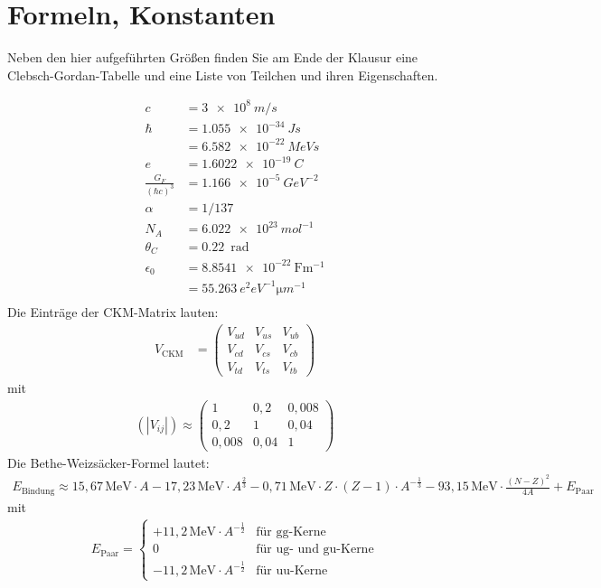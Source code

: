 \thispagestyle{empty}
\section*{Formeln, Konstanten}
Neben den hier aufgef\"uhrten Gr\"o{\ss}en finden Sie am Ende der Klausur eine Clebsch-Gordan-Tabelle und eine Liste von Teilchen und ihren Eigenschaften.

\begin{align*}
 c &= \SI{3e8}{m/s} \\
 \hbar &= \SI{1.055e-34}{Js} \\ &= \SI{6.582e-22}{MeV s}\\
 e &= \SI{1.6022e-19}{C} \\ 
 \frac{G_F}{(\hbar c)^3} &= \SI{1.166e-5}{GeV^{-2}} \\
 \alpha &= 1/137 \\
 N_A &= \SI{6.022e23}{mol^{-1}} \\
 \theta_C &= 0.22 \, {\text{ rad}} \\
 \epsilon_0 &= \SI{8.8541e-22}{\farad \metre^{-1}} \\ &= \SI{55.263}{e^2 eV^{-1} \micro m^{-1}} \\
\end{align*}
Die Einträge der CKM-Matrix lauten:
\begin{align*}
    V_\text{CKM} &= 
      \begin{pmatrix}
      V_{ud} & V_{us} & V_{ub} \\
      V_{cd} & V_{cs} & V_{cb} \\
      V_{td} & V_{ts} & V_{tb}
  \end{pmatrix}
\end{align*}
mit
\begin{align*}
 (|V_{ij}|) \approx
  \begin{pmatrix}
      1         & 0,2   & 0,008 \\
      0,2     & 1       & 0,04 \\
      0,008 & 0,04 & 1
  \end{pmatrix}
\end{align*}
Die Bethe-Weizs\"acker-Formel lautet:
\begin{align*}
E_\text{Bindung}\approx15,67\,\text{MeV}\cdot A - 17,23\,\text{MeV}\cdot A^{\frac 2 3} - 0,71\,\text{MeV}\cdot Z\cdot(Z-1) \cdot A^{-\frac 1 3} -  93,15\,\text{MeV}\cdot \frac{(N-Z)^2}{4A} + E_\text{Paar}
\end{align*}
mit
\begin{align*}
E_\text{Paar} = 
   \begin{cases}
     +11,2\,\text{MeV}\cdot A^{-\frac 1 2} & \text{f\"ur gg-Kerne}\\
     0  & \text{f\"ur ug- und gu-Kerne}\\
     -11,2\,\text{MeV} \cdot A^{-\frac 1 2} & \text{f\"ur uu-Kerne} 
   \end{cases}
\end{align*}

